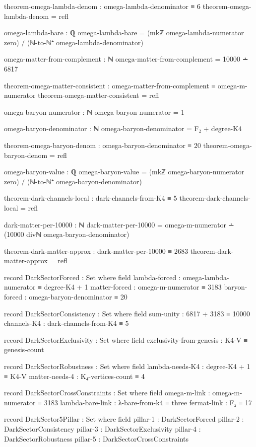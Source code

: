 \documentclass[11pt,a4paper]{book}
\begin{document}
\begin{code}
  theorem-omega-lambda-denom : omega-lambda-denominator ≡ 6
  theorem-omega-lambda-denom = refl
  
  omega-lambda-bare : ℚ
  omega-lambda-bare = (mkℤ omega-lambda-numerator zero) / (ℕ-to-ℕ⁺ omega-lambda-denominator)
  
  omega-matter-from-complement : ℕ
  omega-matter-from-complement = 10000 ∸ 6817
  
  theorem-omega-matter-consistent : omega-matter-from-complement ≡ omega-m-numerator
  theorem-omega-matter-consistent = refl
  
  omega-baryon-numerator : ℕ
  omega-baryon-numerator = 1
  
  omega-baryon-denominator : ℕ
  omega-baryon-denominator = F₂ + degree-K4
  
  theorem-omega-baryon-denom : omega-baryon-denominator ≡ 20
  theorem-omega-baryon-denom = refl
  
  omega-baryon-value : ℚ
  omega-baryon-value = (mkℤ omega-baryon-numerator zero) / (ℕ-to-ℕ⁺ omega-baryon-denominator)
  
  theorem-dark-channels-local : dark-channels-from-K4 ≡ 5
  theorem-dark-channels-local = refl
  
  dark-matter-per-10000 : ℕ
  dark-matter-per-10000 = omega-m-numerator ∸ (10000 divℕ omega-baryon-denominator)
  
  theorem-dark-matter-approx : dark-matter-per-10000 ≡ 2683
  theorem-dark-matter-approx = refl
  
  record DarkSectorForced : Set where
    field
      lambda-forced : omega-lambda-numerator ≡ degree-K4 + 1
      matter-forced : omega-m-numerator ≡ 3183
      baryon-forced : omega-baryon-denominator ≡ 20
  
  record DarkSectorConsistency : Set where
    field
      sum-unity   : 6817 + 3183 ≡ 10000
      channels-K4 : dark-channels-from-K4 ≡ 5
  
  record DarkSectorExclusivity : Set where
    field
      exclusivity-from-genesis : K4-V ≡ genesis-count
  
  record DarkSectorRobustness : Set where
    field
      lambda-needs-K4 : degree-K4 + 1 ≡ K4-V
      matter-needs-4  : K₄-vertices-count ≡ 4
  
  record DarkSectorCrossConstraints : Set where
    field
      omega-m-link     : omega-m-numerator ≡ 3183
      lambda-bare-link : λ-bare-from-k4 ≡ three
      fermat-link      : F₂ ≡ 17
  
  record DarkSector5Pillar : Set where
    field
      pillar-1 : DarkSectorForced
      pillar-2 : DarkSectorConsistency
      pillar-3 : DarkSectorExclusivity
      pillar-4 : DarkSectorRobustness
      pillar-5 : DarkSectorCrossConstraints
  

\end{code}
\end{document}
